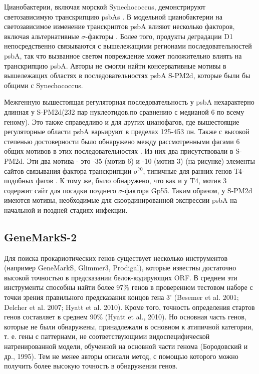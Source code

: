 \documentclass[14pt]{extarticle}
\begin{document}
    \par{Цианобактерии, включая морской Synechococcus, демонстрируют светозависимую транскрипцию psbAs \cite{18_,23_}. В
    модельной цианобактерии на светозависимое изменение транскриптов psbA влияют несколько факторов, включая 
    альтернативные $\sigma$-факторы \cite{24_,25_}. Более того, продукты деградации D1 непосредственно связываются с 
    вышележащими регионами последовательностей psbA, так что вызванное светом повреждение может положительно влиять на 
    транскрипцию psbA. Авторы не смогли найти консервативные мотивы в вышележащих областях в последовательностях psbA 
    S-PM2d, которые были бы общими с Synechococcus.} 
    
    \par{Межгенную вышестоящая регуляторная последовательность у psbA нехарактерно длинная у S-PM2d(232 пар 
    нуклеотидов,по сравнению с медианой 6 по всему геному). Это также справедливо и для других цианофагов, где 
    вышестоящие регуляторные области psbA варьируют в пределах 125-453 пн. Также с высокой степенью достоверности  было 
    обнаружено между рассмотренными фагами 6 общих мотивов в этих последовательностях \cite{puxty-evanx}. Из них два 
    присутствовали в S-PM2d. Эти два мотива - это  -35 (мотив 6) и -10 (мотив 3) (на рисунке) элементы сайтов связывания
    фактора транскрипции $\sigma^{70}$, типичные для ранних генов Т4-подобных фагов \cite{31_}. К тому же, было 
    обнаружено, что как и у T4, мотив 3 содержит сайт для посадки позднего $\sigma$-фактора Gp55. Таким образом, у 
    S-PM2d имеются мотивы, необходимые для скоординированной экспрессии psbA на начальной и поздней стадиях инфекции.}
    
    \begin{center}
        \item \subsection{GeneMarkS-2}
    \end{center}
    
   
    
    \par{Для поиска прокариотических генов существует несколько инструментов (например GeneMarkS, Glimmer3, Prodigal), 
    которые известны достаточно высокой точностью в предсказании белок-кодирующих ORF. В среднем эти инструменты 
    способны найти более 97\% генов в проверенном тестовом наборе с точки зрения правильного предсказания концов гена 3'
    (Besemer et al. 2001; Delcher et al. 2007; Hyatt et al. 2010). Кроме того, точность определения стартов генов 
    составляет в среднем 90\% (Hyatt et al., 2010). Но основная часть генов, которые не были обнаружены, принадлежали в 
    основном к атипичной категории, т. е. гены с паттернами, не соответствующими видоспецифической натренированной 
    модели, обученной на основной части генома (Бородовский и др., 1995). Тем не менее авторы описали метод, с помощью 
    которого можно получить более высокую точность в обнаружении генов. \cite{lomsad}}
    
\end{document}
